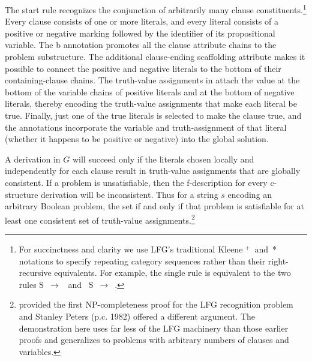\documentclass[output=paper,hidelinks]{langscibook}
\begin{document}
\noindent The start rule  recognizes the conjunction of arbitrarily many clause constituents.\footnote{For succinctness and clarity we use LFG's traditional Kleene \mbox{$^+$ and *} notations to specify repeating category sequences rather than their right-recursive equivalents.  For example, the single rule  is equivalent to the two rules
\def\annotations{\tiny}
    \mbox{S $\rightarrow$ \hsp{-.3em}}
  and
 \  \mbox{S $\rightarrow$ \hsp{-.3em}\hsp{-1.2ex}\hsp{-1em}}.\def\annotationsize{}}  Every clause consists of one or more literals, and every literal consists of a positive or negative marking followed by the identifier of its propositional variable.  The  b annotation promotes all the clause attribute chains to the problem substructure. The additional clause-ending scaffolding attribute  makes it possible to connect the positive and negative literals to the bottom of their containing-clause chains. The truth-value assignments in  attach the value  at the bottom of the variable chains of positive literals and  at the bottom of negative literals, thereby encoding the truth-value assignments that make each literal be true. Finally, just one of the true literals is selected to make the clause true, and the  annotations incorporate the variable and truth-assignment of that literal (whether it happens to be positive or negative) into the global solution. 

A derivation in $G$ will succeed only if the literals chosen locally and independently for each clause result in  truth-value assignments that are globally consistent. If a problem is unsatisfiable, then the f-description for every c-structure derivation will be inconsistent.  Thus for a string $s$ encoding an arbitrary Boolean problem, the set  if and only if that problem is satisfiable for at least one consistent set of truth-value assignments.\footnote{\citet{Berwick1982} provided the first \textsf{NP}-completeness proof for the LFG recognition problem and Stanley Peters (p.c. 1982) offered a different argument.  The demonstration here uses far less of the LFG machinery than those earlier proofs and generalizes to problems with arbitrary numbers of clauses and variables.}
\end{document}
